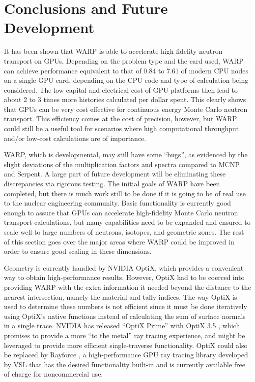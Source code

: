 \documentclass[preprint,12pt]{elsarticle}
\begin{document}
\section{Conclusions and Future Development}
\label{sec:concdev}

It has been shown that WARP is able to accelerate high-fidelity neutron transport on GPUs.  Depending on the problem type and the card used, WARP can achieve performance equivalent to that of 0.84 to 7.61 of modern CPU nodes on a single GPU card, depending on the CPU code and type of calculation being considered.  The low capital and electrical cost of GPU platforms then lead to about 2 to 3 times more histories calculated per dollar spent.  This clearly shows that GPUs can be very cost effective for continuous energy Monte Carlo neutron transport.  This efficiency comes at the cost of precision, however, but WARP could still be a useful tool for scenarios where high computational throughput and/or low-cost calculations are of importance.

WARP, which is developmental, may still have some ``bugs'', as evidenced by the slight deviations of the multiplication factors and spectra compared to MCNP and Serpent.  A large part of future development will be eliminating these discrepancies via rigorous testing.  The initial goals of WARP have been completed, but there is much work still to be done if it is going to be of real use to the nuclear engineering community.  Basic functionality is currently good enough to assure that GPUs can accelerate high-fidelity Monte Carlo neutron transport calculations, but many capabilities need to be expanded and ensured to scale well to large numbers of neutrons, isotopes, and geometric zones.  The rest of this section goes over the major areas where WARP could be improved in order to ensure good scaling in these dimensions.    

Geometry is currently handled by NVIDIA OptiX, which provides a convenient way to obtain high-performance results. However, OptiX had to be coerced into providing WARP with the extra information it needed beyond the distance to the nearest intersection, namely the material and tally indices.  The way OptiX is used to determine these numbers is not efficient since it must be done iteratively using OptiX's native functions instead of calculating the sum of surface normals in a single trace.  NVIDIA has released ``OptiX Prime'' with OptiX 3.5 \cite{optix3.5}, which promises to provide a more ``to the metal'' ray tracing experience, and might be leveraged to provide more efficient single-traverse functionality.  OptiX could also be replaced by Rayforce \cite{rayforce}, a high-performance GPU ray tracing library developed by VSL that has the desired functionality built-in and is currently available free of charge for noncommercial use.
\end{document}
